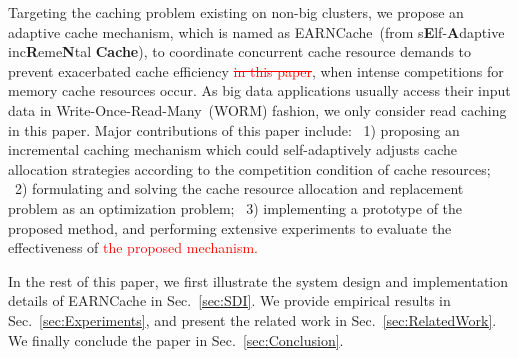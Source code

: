 Targeting the caching problem existing on non-big clusters, we propose an adaptive cache mechanism, which is named as EARNCache~(from s\textbf{E}lf-\textbf{A}daptive inc\textbf{R}eme\textbf{N}tal \textbf{Cache}), to coordinate concurrent cache resource demands to prevent exacerbated cache efficiency \textcolor{red}{\sout{in this paper}}, when intense competitions for memory cache resources occur. As big data applications usually access their input data in Write-Once-Read-Many~(WORM) fashion, we only consider read caching in this paper. Major contributions of this paper include: ~1) proposing an incremental caching mechanism which could self-adaptively adjusts cache allocation strategies according to the competition condition of cache resources; ~2) formulating and solving the cache resource allocation and replacement problem as an optimization problem; ~3) implementing a prototype of the proposed method, and performing extensive experiments to evaluate the effectiveness of \textcolor{red}{the proposed mechanism.}


In the rest of this paper, we first illustrate the system design and implementation details of EARNCache in Sec.~\ref{sec:SDI}. We provide empirical results in Sec.~\ref{sec:Experiments}, and present the related work in Sec.~\ref{sec:RelatedWork}. We finally conclude the paper in Sec.~\ref{sec:Conclusion}.
